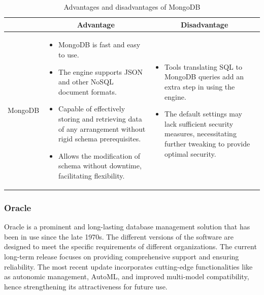 \begin{table}[H]
    \centering
    \begin{tabular}{| c | p{} | p{} |}
        \hline
        \multicolumn{1}{|c|}{}
        & \multicolumn{1}{c|}{Advantage}
        & \multicolumn{1}{c|}{Disadvantage} \\ \hline
        \multirow{7}{*}{MongoDB}     
                &   \begin{itemize}[leftmargin=*,topsep=0pt,partopsep=0pt,parsep=0pt]
                        \item MongoDB is fast and easy to use.
                        \item The engine supports JSON and other NoSQL document formats.
                        \item Capable of effectively storing and retrieving data of any arrangement without rigid schema prerequisites.
                        \item  Allows the modification of schema without downtime, facilitating flexibility.
                    \end{itemize}
                &   \begin{itemize}[leftmargin=*,topsep=0pt,partopsep=0pt,parsep=0pt]
                        \item Tools translating SQL to MongoDB queries add an extra step in using the engine.
                        \item The default settings may lack sufficient security measures, necessitating further tweaking to provide optimal security.
                    \end{itemize} \\ \hline
    \end{tabular}
    \caption{Advantages and disadvantages of MongoDB}
\end{table}

\subsubsection{Oracle}

Oracle is a prominent and long-lasting database management solution that has been in use since the late 1970s. The different versions of the software are designed to meet the specific requirements of different organizations. The current long-term release focuses on providing comprehensive support and ensuring reliability. The most recent update incorporates cutting-edge functionalities like as autonomic management, AutoML, and improved multi-model compatibility, hence strengthening its attractiveness for future use.

